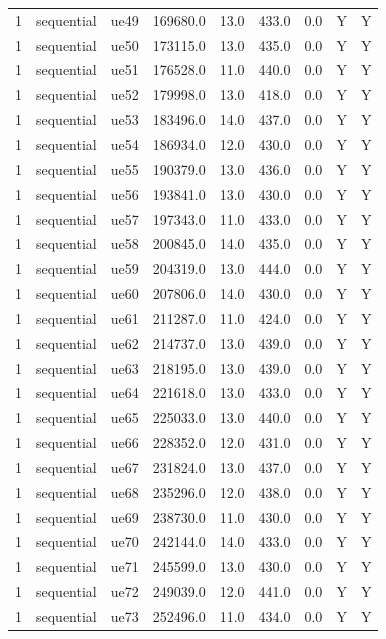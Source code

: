 \begin{table}[ht]
\begin{tabular}{|c|c|c|c|c|c|c|c|c|}
1 & sequential & ue49 & 169680.0 & 13.0 & 433.0 & 0.0 & Y & Y \\
1 & sequential & ue50 & 173115.0 & 13.0 & 435.0 & 0.0 & Y & Y \\
1 & sequential & ue51 & 176528.0 & 11.0 & 440.0 & 0.0 & Y & Y \\
1 & sequential & ue52 & 179998.0 & 13.0 & 418.0 & 0.0 & Y & Y \\
1 & sequential & ue53 & 183496.0 & 14.0 & 437.0 & 0.0 & Y & Y \\
1 & sequential & ue54 & 186934.0 & 12.0 & 430.0 & 0.0 & Y & Y \\
1 & sequential & ue55 & 190379.0 & 13.0 & 436.0 & 0.0 & Y & Y \\
1 & sequential & ue56 & 193841.0 & 13.0 & 430.0 & 0.0 & Y & Y \\
1 & sequential & ue57 & 197343.0 & 11.0 & 433.0 & 0.0 & Y & Y \\
1 & sequential & ue58 & 200845.0 & 14.0 & 435.0 & 0.0 & Y & Y \\
1 & sequential & ue59 & 204319.0 & 13.0 & 444.0 & 0.0 & Y & Y \\
1 & sequential & ue60 & 207806.0 & 14.0 & 430.0 & 0.0 & Y & Y \\
1 & sequential & ue61 & 211287.0 & 11.0 & 424.0 & 0.0 & Y & Y \\
1 & sequential & ue62 & 214737.0 & 13.0 & 439.0 & 0.0 & Y & Y \\
1 & sequential & ue63 & 218195.0 & 13.0 & 439.0 & 0.0 & Y & Y \\
1 & sequential & ue64 & 221618.0 & 13.0 & 433.0 & 0.0 & Y & Y \\
1 & sequential & ue65 & 225033.0 & 13.0 & 440.0 & 0.0 & Y & Y \\
1 & sequential & ue66 & 228352.0 & 12.0 & 431.0 & 0.0 & Y & Y \\
1 & sequential & ue67 & 231824.0 & 13.0 & 437.0 & 0.0 & Y & Y \\
1 & sequential & ue68 & 235296.0 & 12.0 & 438.0 & 0.0 & Y & Y \\
1 & sequential & ue69 & 238730.0 & 11.0 & 430.0 & 0.0 & Y & Y \\
1 & sequential & ue70 & 242144.0 & 14.0 & 433.0 & 0.0 & Y & Y \\
1 & sequential & ue71 & 245599.0 & 13.0 & 430.0 & 0.0 & Y & Y \\
1 & sequential & ue72 & 249039.0 & 12.0 & 441.0 & 0.0 & Y & Y \\
1 & sequential & ue73 & 252496.0 & 11.0 & 434.0 & 0.0 & Y & Y \\

\end{tabular}
\end{table}
